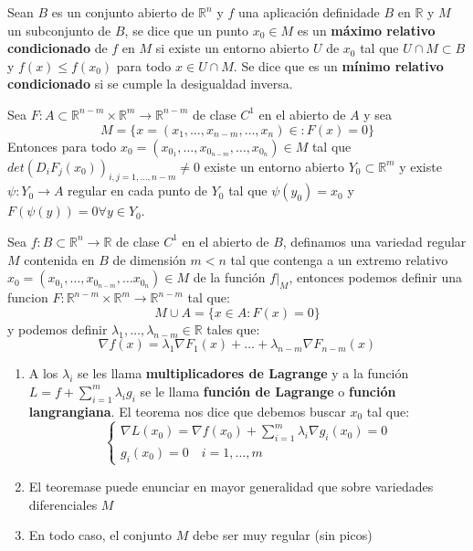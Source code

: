 \begin{definición}
    Sean $B$ es un conjunto abierto de $\mathbb{R}^n$ y $f$ una aplicación definidade $B$ en $\mathbb{R}$ y $M$ un subconjunto de $B$, se dice que un punto $x_0 \in M$ es un \textbf{máximo relativo condicionado} de $f$ en $M$ si existe un entorno abierto $U$ de $x_0$ tal que $U \cap M \subset B$ y $f(x) \leq f(x_0)$ para todo $x \in U \cap M$. Se dice que es un \textbf{mínimo relativo condicionado} si se cumple la desigualdad inversa.
\end{definición}


\begin{lema}
    Sea $F:A\subset \mathbb{R}^{n-m} \times \mathbb{R}^m \to \mathbb{R}^{n-m}$ de clase $C^1$ en el abierto de $A$ y sea
    $$ M = \{x = (x_1, \ldots, x_{n-m}, \ldots,x_n) \in : F(x) = 0\}$$
    Entonces para todo $x_0 = (x_{0_1}, \ldots, x_{0_{n-m}}, \ldots, x_{0_n}) \in M$ tal que $det(D_iF_j(x_0))_{i, j = 1, \ldots, n-m} \neq 0$ existe un entorno abierto $Y_0 \subset \mathbb{R}^m$ y existe $\psi: Y_0 \to A$ regular en cada punto de $Y_0$ tal que $\psi(y_0) = x_0$ y $F(\psi(y)) = 0 \forall y \in Y_0$.
\end{lema}

\begin{teorema}
    Sea $f: B \subset \mathbb{R}^n \to \mathbb{R}$ de clase $C^1$ en el abierto de $B$, definamos una variedad regular $M$ contenida en $B$ de dimensión $m < n$ tal que contenga a un extremo relativo $x_0 = (x_{0_1}, \ldots, x_{0_{n-m}}, \ldots x_{0_n}) \in M$ de la función $f\vert_{M}$, entonces podemos definir una funcion $F: \mathbb{R}^{n - m} \times \mathbb{R}^m \to \mathbb{R}^{n-m}$ tal que: 
    $$M \cup A = \{x \in A : F(x) = 0\}$$
    y podemos definir $\lambda_1, \ldots, \lambda_{n-m} \in \mathbb{R}$ tales que: 
    $$\nabla f(x) = \lambda_1 \nabla F_1(x) + \ldots + \lambda_{n - m}\nabla F_{n-m}(x)$$
\end{teorema}
\begin{observación}
    \begin{enumerate}
        \item A los $\lambda_i$ se les llama \textbf{multiplicadores de Lagrange} y a la función $L = f + \sum_{i=1}^m \lambda_i g_i$ se le llama \textbf{función de Lagrange} o \textbf{función langrangiana}.
        El teorema nos dice que debemos buscar $x_0$ tal que: 
        $$\begin{cases}
            \nabla L(x_0) = \nabla f(x_0) + \sum_{i=1}^m \lambda_i \nabla g_i(x_0) = 0 \\
            g_i(x_0) = 0 \quad i = 1, \ldots, m
        \end{cases}$$
        \item El teoremase puede enunciar en mayor generalidad que sobre variedades diferenciales $M$
        \item En todo caso, el conjunto $M$ debe ser muy regular (sin picos)
    \end{enumerate}
\end{observación}